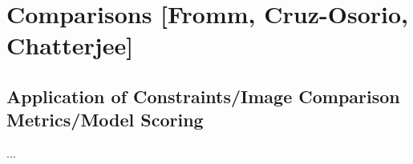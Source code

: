 \documentclass[twocolumn,tighten,dvipsnames]{aastex63}
\newcommand\note[1]{{\color{OliveGreen}[note: #1]}}
\begin{document}

\section{Comparisons
  [Fromm, Cruz-Osorio, Chatterjee]}
\label{sec:comparisons}

\subsection{Application of Constraints/Image Comparison Metrics/Model Scoring}
\label{sec:apply}

...









\end{document}
